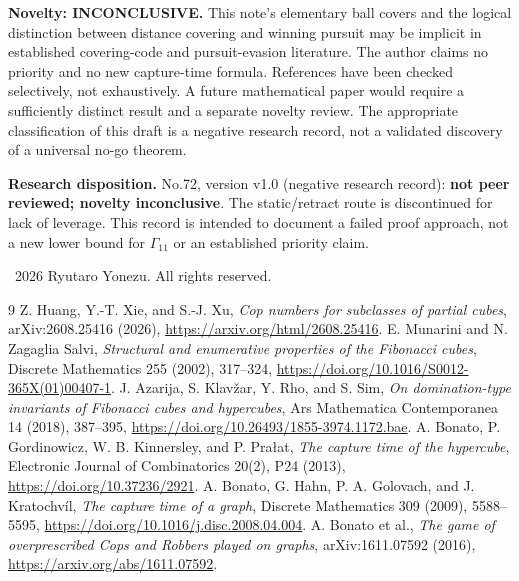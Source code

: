 \documentclass[10pt]{article}
\newcommand{\Ga}{\Gamma}
\begin{document}
\textbf{Novelty: INCONCLUSIVE.} This note's elementary ball covers and
the logical distinction between distance covering and winning pursuit
may be implicit in established covering-code and pursuit-evasion
literature. The author claims no priority and no new capture-time formula.
References have been checked selectively, not exhaustively.
A future mathematical paper would require a sufficiently distinct
result and a separate novelty review. The appropriate classification of
this draft is a negative research record, not a validated discovery of
a universal no-go theorem.

\vspace{3pt}\noindent\textbf{Research disposition.}
No.72, version v1.0 (negative research record): \textbf{not peer reviewed; novelty inconclusive}.
The static/retract route is discontinued for lack of leverage.
This record is intended to document a failed proof approach, not a new lower bound for $\Ga_{11}$ or an established priority claim.
\par\smallskip
\noindent\textcopyright\ 2026 Ryutaro Yonezu. All rights reserved.

\begin{thebibliography}{9}
Z. Huang, Y.-T. Xie, and S.-J. Xu,
\emph{Cop numbers for subclasses of partial cubes},
arXiv:2608.25416 (2026), \url{https://arxiv.org/html/2608.25416}.
E. Munarini and N. Zagaglia Salvi,
\emph{Structural and enumerative properties of the Fibonacci cubes},
Discrete Mathematics 255 (2002), 317--324,
\url{https://doi.org/10.1016/S0012-365X(01)00407-1}.
J. Azarija, S. Klav\v{z}ar, Y. Rho, and S. Sim,
\emph{On domination-type invariants of Fibonacci cubes and hypercubes},
Ars Mathematica Contemporanea 14 (2018), 387--395,
\url{https://doi.org/10.26493/1855-3974.1172.bae}.
A. Bonato, P. Gordinowicz, W. B. Kinnersley, and P. Pra\l at,
\emph{The capture time of the hypercube},
Electronic Journal of Combinatorics 20(2), P24 (2013),
\url{https://doi.org/10.37236/2921}.
A. Bonato, G. Hahn, P. A. Golovach, and J. Kratochv\'il,
\emph{The capture time of a graph},
Discrete Mathematics 309 (2009), 5588--5595,
\url{https://doi.org/10.1016/j.disc.2008.04.004}.
A. Bonato et al., \emph{The game of overprescribed Cops and Robbers played on graphs},
arXiv:1611.07592 (2016), \url{https://arxiv.org/abs/1611.07592}.
\end{thebibliography}
\end{document}
